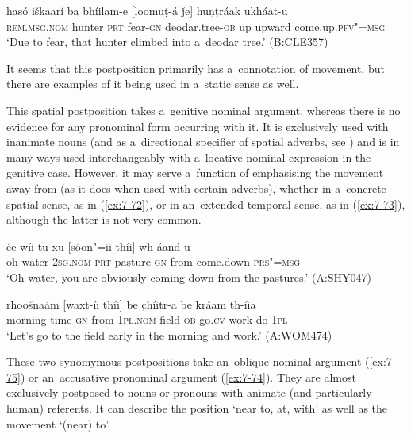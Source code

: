 \begin{exe}
\ex
\label{ex:7-71}
\gll hasó iškaarí ba bhíilam-e [loomuṭ-á ǰe] huṇṭráak ukháat-u\\
\textsc{rem.msg.nom} hunter \textsc{prt} fear-\textsc{gn}  deodar.tree-\textsc{ob} up upward come.up.\textsc{pfv"=msg}\\
\glt `Due to fear, that hunter climbed into a~deodar tree.' (B:CLE357)
\end{exe}

It seems that this postposition primarily has a~connotation of movement, but there are examples of it being used in a~static sense as well.


 This spatial postposition takes a~genitive nominal argument, whereas there is no evidence for any pronominal form occurring with it. It is exclusively used with inanimate nouns (and as a~directional specifier of spatial adverbs, see ) and is in many ways used interchangeably with a~locative nominal expression in the genitive case. However, it may serve a~function of emphasising the movement away from (as it does when used with certain adverbs), whether in a~concrete spatial sense, as in (\ref{ex:7-72}), or in an~extended temporal sense, as in (\ref{ex:7-73}), although the latter is not very common.

\begin{exe}
\ex
\label{ex:7-72}
\gll ée wíi tu xu [sóon"=ii thíi] wh-áand-u \\
oh water \textsc{2sg.nom} \textsc{prt} pasture-\textsc{gn} from  come.down-\textsc{prs"=msg}  \\
\glt `Oh water, you are obviously coming down from the pastures.' (A:SHY047)
\end{exe}
\begin{exe}
\ex
\label{ex:7-73}
\gll rhoošnaám [waxt-íi thíi] be c̣híitr-a be kráam th-íia  \\
morning  time-\textsc{gn} from \textsc{1pl.nom} field-\textsc{ob} go.\textsc{cv} work do-\textsc{1pl} \\
\glt `Let's go to the field early in the morning and work.' (A:WOM474)
\end{exe}

 These two synomymous postpositions take an~oblique nominal argument (\ref{ex:7-75}) or an~accusative pronominal argument (\ref{ex:7-74}). They are almost exclusively postposed to nouns or pronouns with animate (and particularly human) referents. It can describe the position `near to, at, with' as well as the movement `(near) to'. 

